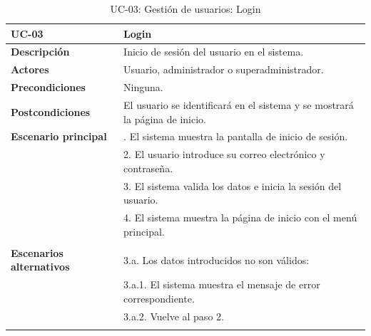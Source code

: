 \begin{table}
  \begin{center}
    \begin{tabularx}{16.4cm}{|l|X|}
      \hline
      \textbf{UC-03} & \textbf{Login}\\
      \hline
      \textbf{Descripción} & Inicio de sesión del usuario en el sistema.\\
      \hline
      \textbf{Actores} & Usuario, administrador o superadministrador.\\
      \hline
      \textbf{Precondiciones} & Ninguna.\\
      \hline
      \textbf{Postcondiciones} & El usuario se identificará en el sistema y se mostrará la página de inicio.\\
      \hline
      \textbf{Escenario principal} & \smallskip 1. El sistema muestra la pantalla de inicio de sesión.\\
      & 2. El usuario introduce su correo electrónico y contraseña.\\
      & 3. El sistema valida los datos e inicia la sesión del usuario.\\
      & 4. El sistema muestra la página de inicio con el menú principal.\\
      & \\
      \hline
      \textbf{Escenarios alternativos} & \smallskip 3.a. Los datos introducidos no son válidos:\\
      & \hspace{0.3cm} 3.a.1. El sistema muestra el mensaje de error correspondiente.\\
      & \hspace{0.3cm} 3.a.2. Vuelve al paso 2.\\
      & \\
      \hline
    \end{tabularx}
    \caption{UC-03: Gestión de usuarios: Login}
    \label{tab:CU-login}
  \end{center}
\end{table}


